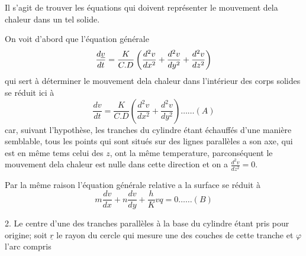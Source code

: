 \documentclass[11pt,a4paper]{article}
\begin{document}
Il s'agit de trouver les équations qui doivent représenter le
mouvement dela chaleur dans un tel solide.

On voit d'abord que l'équation générale
\[ \frac{d\uncertain{v}}{dt} = \frac{K}{C.D}\left(\frac{d^2v}{dx^2} + \frac{d^2v}{dy^2} + \frac{d^2v}{dz^2}\right) \]
qui sert à déterminer le mouvement dela chaleur
dans l'intérieur des corps solides se réduit ici à
\[ \frac{dv}{dt} = \frac{K}{C.D}\left(\frac{d^2v}{dx^2} + \frac{d^2v}{dy^2}\right) \ldots\ldots (A) \]
car, suivant l'hypothèse, les tranches du cylindre étant
échauffés d'une manière semblable, tous les points qui
sont situés sur des lignes parallèles a son axe, qui est
en même tems celui des $z$, ont la même temperature,
parconséquent le mouvement dela chaleur est nulle dans
cette direction et on a $\frac{d^2v}{dz^2} = 0$.

Par la même raison l'équation générale relative a la surface
se réduit à
\[ m\frac{dv}{dx} + n\frac{dv}{dy} + \frac{h}{K}vq = 0 \ldots\ldots (B) \]

2. Le centre d'une des tranches parallèles à la base du cylindre
étant pris pour origine; soit $\underline{r}$ le rayon du cercle qui mesure
une des couches de cette tranche et $\varphi$ l'arc compris

\end{document}
